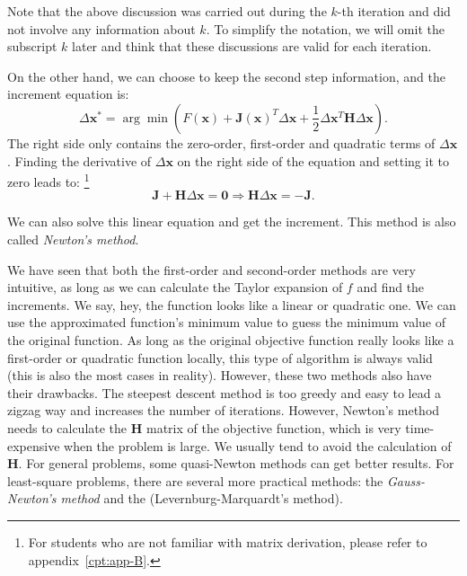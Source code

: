 Note that the above discussion was carried out during the $k$-th iteration and did not involve any information about $k$. To simplify the notation, we will omit the subscript $k$ later and think that these discussions are valid for each iteration.

On the other hand, we can choose to keep the second step information, and the increment equation is:
\begin{equation}
    \Delta \mathbf{x}^* = \arg \min \left(F\left( \mathbf{x} \right) + \mathbf{J} \left( \mathbf{x} \right)^T \Delta \mathbf{x} + \frac{1}{2}\Delta {\mathbf{x}^T}\mathbf{H} \Delta \mathbf{x} \right).
\end{equation}
The right side only contains the zero-order, first-order and quadratic terms of $\Delta \mathbf{x}$. Finding the derivative of $\Delta \mathbf{x}$ on the right side of the equation and setting it to zero leads to: \footnote{For students who are not familiar with matrix derivation, please refer to appendix~\ref{cpt:app-B}. }
\begin{equation}
    \label{eq:newton-method}
    \mathbf{J} + \mathbf{H} \Delta \mathbf{x} = \mathbf{0} \Rightarrow
    \mathbf{H} \Delta \mathbf{x} = -\mathbf{J}.
\end{equation}

We can also solve this linear equation and get the increment. This method is also called \textit{Newton's method}.

We have seen that both the first-order and second-order methods are very intuitive, as long as we can calculate the Taylor expansion of $f$ and find the increments. We say, hey, the function looks like a linear or quadratic one. We can use the approximated function's minimum value to guess the minimum value of the original function. As long as the original objective function really looks like a first-order or quadratic function locally, this type of algorithm is always valid (this is also the most cases in reality). However, these two methods also have their drawbacks. The steepest descent method is too greedy and easy to lead a zigzag way and increases the number of iterations. However, Newton's method needs to calculate the $\mathbf{H}$ matrix of the objective function, which is very time-expensive when the problem is large. We usually tend to avoid the calculation of $\mathbf{H}$. For general problems, some quasi-Newton methods can get better results. For least-square problems, there are several more practical methods: the \textit{Gauss-Newton's method} and the (Levernburg-Marquardt's method).

